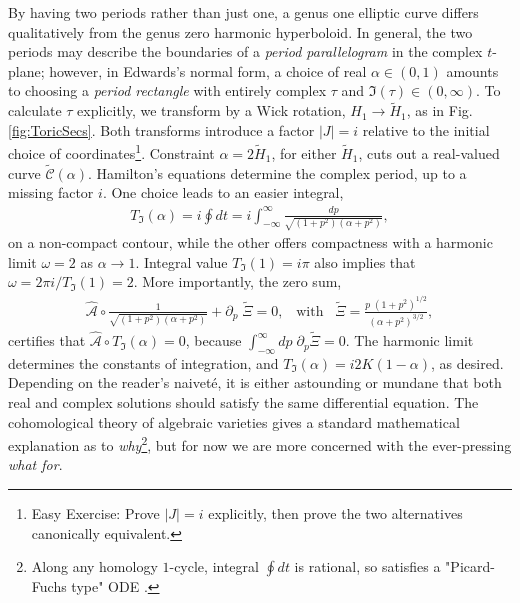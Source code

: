 \documentclass[nofootinbib,preprint]{revtex4-1}
\begin{document}
By having two periods rather than just one, a genus one elliptic curve differs qualitatively 
from the genus zero harmonic hyperboloid. In general, the two periods may describe the 
boundaries of a \textit{period parallelogram} in the complex $t$-plane; however, in Edwards's normal 
form, a choice of real $\alpha \in (0,1)$ amounts to choosing a \textit{period rectangle} with entirely 
complex $\tau$ and $\mathfrak{I}(\tau) \in (0,\infty)$. To calculate $\tau$ explicitly, we transform 
by a Wick rotation, $H_1 \rightarrow \widetilde{H}_1$, as in Fig. \ref{fig:ToricSecs}. Both transforms 
introduce a factor $|J|=i$ relative to the initial choice of coordinates\footnote{
Easy Exercise: Prove $|J|=i$ explicitly, then prove the two alternatives canonically equivalent.}.
Constraint $\alpha=2\widetilde{H}_1$, for either $\widetilde{H}_1$, cuts out a real-valued curve 
$\widetilde{\mathcal{C}}(\alpha)$. Hamilton's equations determine the complex period, 
up to a missing factor $i$. One choice leads to an easier integral,
\begin{eqnarray}
T_{\mathfrak{I}}(\alpha) = i \oint dt = i \int_{-\infty}^{\infty} \frac{dp}{\sqrt{(1+p^2)(\alpha+p^2)}},  \nonumber 
\end{eqnarray}
on a non-compact contour, while the other offers compactness with a harmonic limit 
$\omega=2$ as $\alpha \rightarrow 1$. Integral value $T_{\mathfrak{I}}(1) = i \pi$ also 
implies that $\omega = 2\pi i/T_{\mathfrak{I}}(1) =2$.  More importantly, the zero sum, 
\begin{eqnarray}\widehat{\mathcal{A}} \circ \frac{1}{\sqrt{(1+p^2)(\alpha+p^2)}} 
+ \partial_p \; \widetilde{\Xi} = 0, \;\;\;\text{with}\;\;\; 
\widetilde{\Xi} = \frac{p\;(1+p^2)^{1/2}}{(\alpha+p^2)^{3/2}},  \nonumber
\end{eqnarray}
certifies that $\widehat{\mathcal{A}} \circ T_{\mathfrak{I}}(\alpha)=0$, because
$\int_{-\infty}^{\infty} dp \; \partial_{p} \widetilde{\Xi}=0$. The harmonic 
limit determines the constants of integration, and $T_{\mathfrak{I}}(\alpha) = i 2K(1-\alpha)$,
as desired. Depending on the reader's naivet\'{e}, it is either astounding or mundane that 
both real and complex solutions should satisfy the same differential equation. The 
cohomological theory of algebraic varieties gives a standard mathematical explanation
as to \textit{why}\footnote{Along any homology $1$-cycle, integral $\oint dt$ is rational, so
satisfies a "Picard-Fuchs type" ODE \cite{LAIREZ2016}.}, but for now we are more concerned 
with the ever-pressing \textit{what for}.
\end{document}
